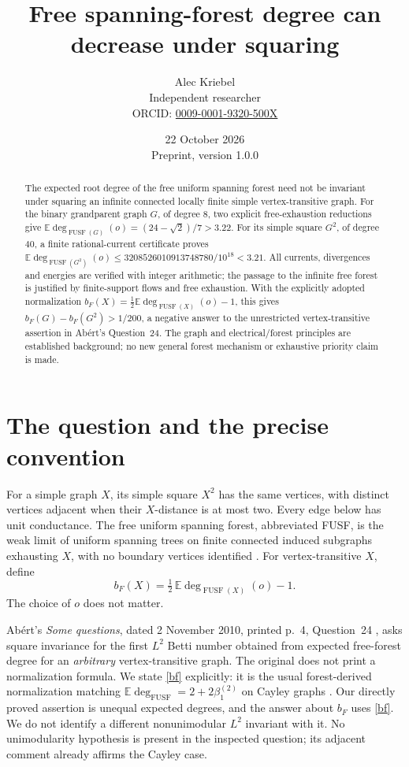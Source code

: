 \documentclass[11pt]{article}
\title{Free spanning-forest degree can decrease under squaring}
\author{Alec Kriebel\\
\small Independent researcher\\
\small ORCID: \href{https://orcid.org/0009-0001-9320-500X}{0009-0001-9320-500X}}
\date{22 October 2026\\\small Preprint, version 1.0.0}
\theoremstyle{remark}\newtheorem{remark}[theorem]{Remark}
\newcommand{\FUSF}{\operatorname{FUSF}}
\newcommand{\E}{\mathbb E}
\begin{document}
\maketitle
\begin{abstract}
The expected root degree of the free uniform spanning forest need not be
invariant under squaring an infinite connected locally finite simple
vertex-transitive graph. For the binary grandparent graph \(G\), of degree
\(8\), two explicit free-exhaustion reductions give
\(\E\deg_{\FUSF(G)}(o)=(24-\sqrt2)/7>3.22\).
For its simple square \(G^2\), of degree \(40\), a finite rational-current
certificate proves
\(\E\deg_{\FUSF(G^2)}(o)\le3208526010913748780/10^{18}<3.21\).
All currents, divergences and energies are verified with integer arithmetic;
the passage to the infinite free forest is justified by finite-support
flows and free exhaustion. With the explicitly adopted normalization
\(b_F(X)=\frac12\E\deg_{\FUSF(X)}(o)-1\), this gives
\(b_F(G)-b_F(G^2)>1/200\), a negative answer to the unrestricted
vertex-transitive assertion in Ab\'ert's Question~24.
The graph and electrical/forest principles are established background;
no new general forest mechanism or exhaustive priority claim is made.
\end{abstract}

\section{The question and the precise convention}
For a simple graph \(X\), its simple square \(X^2\) has the same vertices,
with distinct vertices adjacent when their \(X\)-distance is at most two.
Every edge below has unit conductance.
The free uniform spanning forest, abbreviated FUSF, is the weak limit of
uniform spanning trees on finite connected induced subgraphs exhausting
\(X\), with no boundary vertices identified \cite[\S5]{BLPS}.
For vertex-transitive \(X\), define
\begin{equation}\label{bf}
 b_F(X)=\tfrac12\,\E\deg_{\FUSF(X)}(o)-1.
\end{equation}
The choice of \(o\) does not matter.

Ab\'ert's \emph{Some questions}, dated 2 November 2010, printed p.~4,
Question~24 \cite{Abert}, asks square invariance for the first \(L^2\)
Betti number obtained from expected free-forest degree for an
\emph{arbitrary} vertex-transitive graph. The original does not print a
normalization formula. We state \eqref{bf} explicitly: it is the usual
forest-derived normalization matching
\(\E\deg_{\FUSF}=2+2\beta^{(2)}_1\) on Cayley graphs
\cite[p.~1]{PT}. Our directly proved assertion is unequal expected
degrees, and the answer about \(b_F\) uses \eqref{bf}.
We do not identify a different nonunimodular \(L^2\) invariant with it.
No unimodularity hypothesis is present in the inspected question;
its adjacent comment already affirms the Cayley case.
\end{document}
